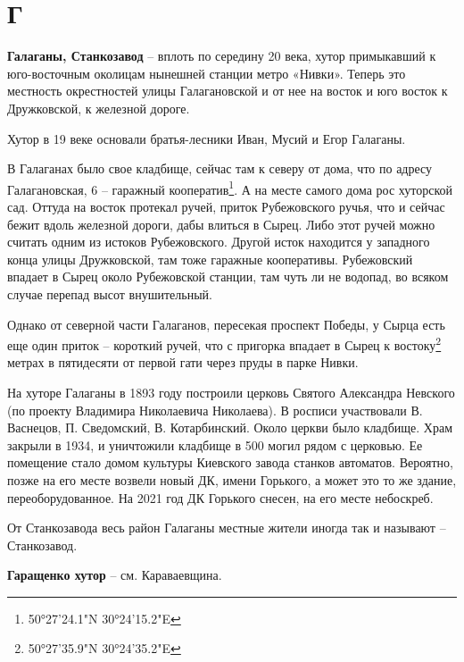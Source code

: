 \chapter*{Г}

\textbf{Галаганы, Станкозавод} – вплоть по середину 20 века, хутор примыкавший к юго-восточ\-ным околицам нынешней станции метро «Нивки». Теперь это местность окрестностей улицы Галагановской и от нее на восток и юго восток к Дружковской, к железной дороге.

Хутор в 19 веке основали братья-лесники Иван, Мусий и Егор Галаганы.

В Галаганах было свое кладбище, сейчас там к северу от дома, что по адресу Галагановская, 6 – гаражный кооператив\footnote{50°27'24.1"N 30°24'15.2"E}. А на месте самого дома рос хуторской сад. Оттуда на восток протекал ручей, приток Рубежовского ручья, что и сейчас бежит вдоль железной дороги, дабы влиться в Сырец. Либо этот ручей можно считать одним из истоков Рубежовского. Другой исток находится у западного конца улицы Дружковской, там тоже гаражные кооперативы. Рубежовский впадает в Сырец около Рубежовской станции, там чуть ли не водопад, во всяком случае перепад высот внушительный.

Однако от северной части Галаганов, пересекая проспект Победы, у Сырца есть еще один приток – короткий ручей, что с пригорка впадает в Сырец к востоку\footnote{50°27'35.9"N 30°24'35.2"E} метрах в пятидесяти от первой гати через пруды в парке Нивки.

На хуторе Галаганы в 1893 году построили церковь Святого Александра Невского (по проекту Владимира Николаевича Николаева). В росписи участвовали В. Васнецов, П. Сведомский, В. Котарбинский. Около церкви было кладбище. Храм закрыли в 1934, и уничтожили кладбище в 500 могил рядом с церковью. Ее помещение стало домом культуры Киевского завода станков автоматов. Вероятно, позже на его месте возвели новый ДК, имени Горького, а может это то же здание, переоборудованное. На 2021 год ДК Горького снесен, на его месте небоскреб.

От Станкозавода весь район Галаганы местные жители иногда так и называют – Станкозавод.\\

\medskip

\textbf{Гаращенко хутор} – см. Караваевщина.\\

\medskip


